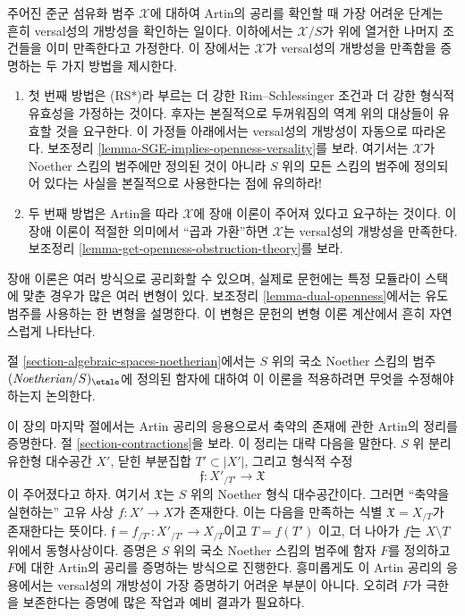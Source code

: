 \medskip\noindent
주어진 준군 섬유화 범주 $\mathcal{X}$에 대하여 Artin의 공리를 확인할 때
가장 어려운 단계는 흔히 versal성의 개방성을 확인하는 일이다. 이하에서는
$\mathcal{X}/S$가 위에 열거한 나머지 조건들을 이미 만족한다고 가정한다.
이 장에서는 $\mathcal{X}$가 versal성의 개방성을 만족함을 증명하는
두 가지 방법을 제시한다.
\begin{enumerate}
\item 첫 번째 방법은 (RS*)라 부르는 더 강한 Rim--Schlessinger 조건과
더 강한 형식적 유효성을 가정하는 것이다. 후자는 본질적으로
두꺼워짐의 역계 위의 대상들이 유효할 것을 요구한다. 이 가정들 아래에서는
versal성의 개방성이 자동으로 따라온다. 보조정리
\ref{lemma-SGE-implies-openness-versality}를 보라.
여기서는 $\mathcal{X}$가 Noether 스킴의 범주에만 정의된 것이 아니라
$S$ 위의 모든 스킴의 범주에 정의되어 있다는 사실을 본질적으로
사용한다는 점에 유의하라!
\item 두 번째 방법은 Artin을 따라 $\mathcal{X}$에 장애 이론이
주어져 있다고 요구하는 것이다. 이 장애 이론이 적절한 의미에서
``곱과 가환''하면 $\mathcal{X}$는 versal성의 개방성을 만족한다.
보조정리 \ref{lemma-get-openness-obstruction-theory}를 보라.
\end{enumerate}
장애 이론은 여러 방식으로 공리화할 수 있으며, 실제로 문헌에는 특정
모듈라이 스택에 맞춘 경우가 많은 여러 변형이 있다. 보조정리
\ref{lemma-dual-openness}에서는 유도 범주를 사용하는 한 변형을 설명한다.
이 변형은 문헌의 변형 이론 계산에서 흔히 자연스럽게 나타난다.

\medskip\noindent
절 \ref{section-algebraic-spaces-noetherian}에서는 $S$ 위의 국소 Noether
스킴의 범주 $(\textit{Noetherian}/S)_\etale$에 정의된 함자에 대하여
이 이론을 적용하려면 무엇을 수정해야 하는지 논의한다.

\medskip\noindent
이 장의 마지막 절에서는 Artin 공리의 응용으로서 축약의 존재에 관한
Artin의 정리를 증명한다. 절 \ref{section-contractions}을 보라.
이 정리는 대략 다음을 말한다. $S$ 위 분리 유한형 대수공간 $X'$,
닫힌 부분집합 $T' \subset |X'|$, 그리고 형식적 수정
$$
\mathfrak{f} : X'_{/T'} \longrightarrow \mathfrak{X}
$$
이 주어졌다고 하자. 여기서 $\mathfrak{X}$는 $S$ 위의 Noether 형식
대수공간이다. 그러면 ``축약을 실현하는'' 고유 사상 $f : X' \to X$가
존재한다. 이는 다음을 만족하는 식별 $\mathfrak{X} = X_{/T}$가
존재한다는 뜻이다.
$\mathfrak{f} = f_{/T'} : X'_{/T'} \to X_{/T}$이고 $T = f(T')$
이고, 더 나아가 $f$는 $X \setminus T$ 위에서 동형사상이다.
증명은 $S$ 위의 국소 Noether 스킴의 범주에 함자 $F$를 정의하고
$F$에 대한 Artin의 공리를 증명하는 방식으로 진행한다.
흥미롭게도 이 Artin 공리의 응용에서는 versal성의 개방성이 가장
증명하기 어려운 부분이 아니다. 오히려 $F$가 극한을 보존한다는 증명에
많은 작업과 예비 결과가 필요하다.




